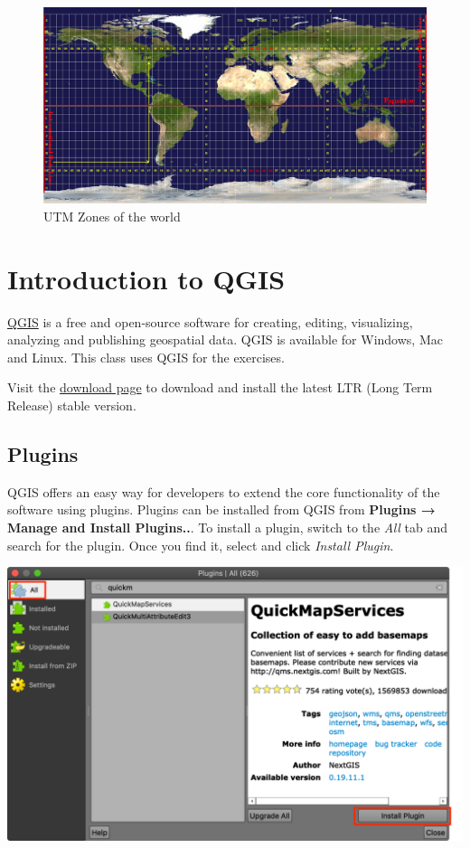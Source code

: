 \documentclass[
  12pt,
  a4paper]{article}
\begin{document}
\begin{figure}

{\centering \includegraphics[width=0.75\linewidth]{images/spatial_data_viz/utm_zones} 

}

\caption{UTM Zones of the world}\label{fig:unnamed-chunk-4}
\end{figure}

\newpage

\hypertarget{introduction-to-qgis}{%
\section{Introduction to QGIS}\label{introduction-to-qgis}}

\href{https://qgis.org/}{QGIS} is a free and open-source software for
creating, editing, visualizing, analyzing and publishing geospatial
data. QGIS is available for Windows, Mac and Linux. This class uses QGIS
for the exercises.

Visit the
\href{https://qgis.org/en/site/forusers/download.html}{download page} to
download and install the latest LTR (Long Term Release) stable version.

\hypertarget{plugins}{%
\subsection{Plugins}\label{plugins}}

QGIS offers an easy way for developers to extend the core functionality
of the software using plugins. Plugins can be installed from QGIS from
\textbf{Plugins → Manage and Install Plugins..}. To install a plugin,
switch to the \emph{All} tab and search for the plugin. Once you find
it, select and click \emph{Install Plugin}.

\begin{center}\includegraphics[width=0.75\linewidth]{images/spatial_data_viz/plugins} \end{center}
\end{document}
